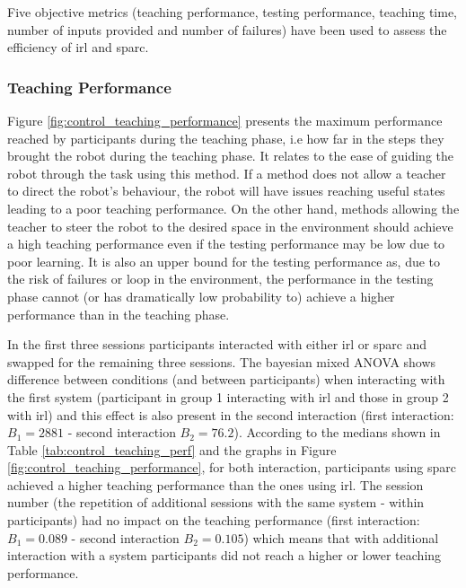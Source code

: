 Five objective metrics (teaching performance, testing performance, teaching time, number of inputs provided and number of failures) have been used to assess the efficiency of \gls{irl} and \gls{sparc}. 

\subsubsection{Teaching Performance}

Figure \ref{fig:control_teaching_performance} presents the maximum performance reached by participants during the teaching phase, i.e how far in the steps they brought the robot during the teaching phase. It relates to the ease of guiding the robot through the task using this method. If a method does not allow a teacher to direct the robot's behaviour, the robot will have issues reaching useful states leading to a poor teaching performance. On the other hand, methods allowing the teacher to steer the robot to the desired space in the environment should achieve a high teaching performance even if the testing performance may be low due to poor learning. It is also an upper bound for the testing performance as, due to the risk of failures or loop in the environment, the performance in the testing phase cannot (or has dramatically low probability to) achieve a higher performance than in the teaching phase.

In the first three sessions participants interacted with either \gls{irl} or \gls{sparc} and swapped for the remaining three sessions. The bayesian mixed ANOVA shows difference between conditions (and between participants) when interacting with the first system (participant in group 1 interacting with \gls{irl} and those in group 2 with \gls{irl}) and this effect is also present in the second interaction (first interaction:$B_1=2881$ - second interaction $B_2 = 76.2$). According to the medians shown in Table \ref{tab:control_teaching_perf} and the graphs in Figure \ref{fig:control_teaching_performance}, for both interaction, participants using \gls{sparc} achieved a higher teaching performance than the ones using \gls{irl}. The session number (the repetition of additional sessions with the same system - within participants) had no impact on the teaching performance (first interaction: $B_1=0.089$ - second interaction $B_2=0.105$) which means that with additional interaction with a system participants did not reach a higher or lower teaching performance.

